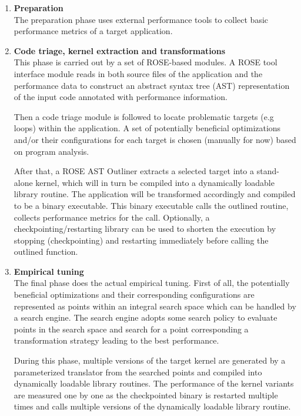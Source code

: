 \begin{enumerate}
   \item {\bf Preparation} \\ 
      The preparation phase uses external performance tools to collect basic performance
      metrics of a target application. 

   \item {\bf Code triage, kernel extraction and transformations} \\
      This phase is carried out by a set of ROSE-based modules. 
      A ROSE tool interface
      module reads in both source files of the application and the performance data to
      construct an abstract syntax tree (AST) representation of the input code annotated
      with performance information. 

      Then a code triage module is followed to locate problematic targets (e.g
      loops) within the application. A set of potentially beneficial
      optimizations and/or their configurations for each target is chosen
      (manually for now) based on program analysis. 

      After that, a ROSE AST Outliner extracts a selected target into
      a stand-alone kernel, which will in turn be compiled into a dynamically loadable library routine. 
      The application will be transformed accordingly and compiled to be a binary executable.
      This binary executable calls the outlined routine, collects performance metrics for
      the call.
      Optionally, a checkpointing/restarting library can be used to shorten
      the execution by stopping (checkpointing) and
      restarting immediately before calling the outlined function.

   \item {\bf Empirical tuning} \\
      The final phase does the actual empirical tuning. First of all, the
      potentially beneficial optimizations and their corresponding configurations
      are represented as points within an integral search space which can be handled by a search engine. 
      The search engine adopts some search policy to evaluate points in the search space
      and search for a point corresponding a transformation strategy leading to the best
      performance. 

      During this phase, multiple versions of the target kernel are generated by
      a parameterized translator%
      from the searched points and compiled into dynamically loadable library
      routines. The performance of the kernel variants are measured one by one as the
      checkpointed binary is restarted multiple times and calls multiple versions
      of the dynamically loadable library routine. 
\end{enumerate}

